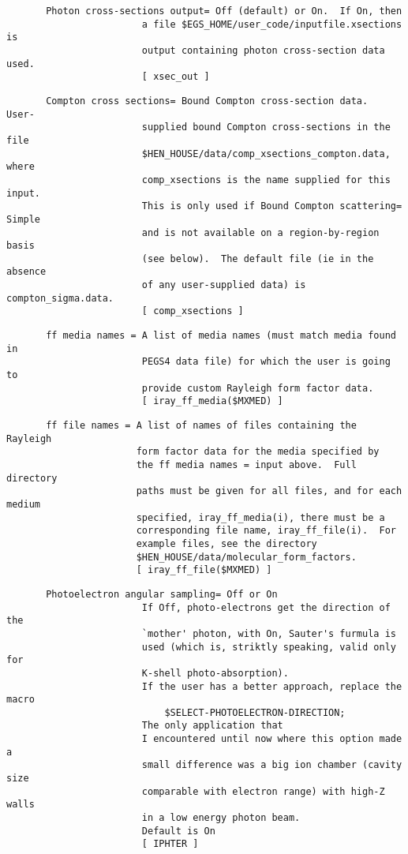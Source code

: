 \begin{verbatim}
       Photon cross-sections output= Off (default) or On.  If On, then
                        a file $EGS_HOME/user_code/inputfile.xsections is
                        output containing photon cross-section data used.
                        [ xsec_out ] 
\end{verbatim}
\begin{verbatim}
       Compton cross sections= Bound Compton cross-section data.  User-
                        supplied bound Compton cross-sections in the file
                        $HEN_HOUSE/data/comp_xsections_compton.data, where
                        comp_xsections is the name supplied for this input.
                        This is only used if Bound Compton scattering= Simple
                        and is not available on a region-by-region basis
                        (see below).  The default file (ie in the absence
                        of any user-supplied data) is compton_sigma.data.
                        [ comp_xsections ]
\end{verbatim}
\begin{verbatim}
       ff media names = A list of media names (must match media found in 
                        PEGS4 data file) for which the user is going to
                        provide custom Rayleigh form factor data.
                        [ iray_ff_media($MXMED) ]
\end{verbatim}
\begin{verbatim}
       ff file names = A list of names of files containing the Rayleigh
                       form factor data for the media specified by
                       the ff media names = input above.  Full directory 
                       paths must be given for all files, and for each medium
                       specified, iray_ff_media(i), there must be a 
                       corresponding file name, iray_ff_file(i).  For
                       example files, see the directory 
                       $HEN_HOUSE/data/molecular_form_factors. 
                       [ iray_ff_file($MXMED) ]
\end{verbatim}
\begin{verbatim}
       Photoelectron angular sampling= Off or On
                        If Off, photo-electrons get the direction of the
                        `mother' photon, with On, Sauter's furmula is
                        used (which is, striktly speaking, valid only for
                        K-shell photo-absorption).
                        If the user has a better approach, replace the macro
                            $SELECT-PHOTOELECTRON-DIRECTION;
                        The only application that
                        I encountered until now where this option made a
                        small difference was a big ion chamber (cavity size
                        comparable with electron range) with high-Z walls
                        in a low energy photon beam.
                        Default is On
                        [ IPHTER ]
\end{verbatim}
